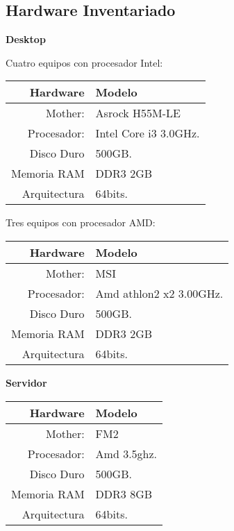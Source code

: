 		
		\subsection{Hardware Inventariado}
		
			\textbf{Desktop}
							
			Cuatro equipos  con procesador Intel:\par\vspace{0.2cm}
				
			\begin{center}
				\begin{tabular}{| r | l |}
					\hline
					Hardware & Modelo \\ \hline
					Mother: & Asrock H55M-LE \\ 
					Procesador: & Intel Core i3 3.0GHz. \\
					Disco Duro & 500GB. \\
					Memoria RAM & DDR3 2GB \\
					Arquitectura & 64bits.\\ \hline
				\end{tabular}
			\end{center}
		
			\vspace{0.3cm}
		
			Tres equipos con procesador AMD:\par\vspace{0.2cm}
					
			\begin{center}			
				\begin{tabular}{| r | l |}
					\hline
					Hardware & Modelo \\ \hline
					Mother: & MSI \\ 
					Procesador: & Amd athlon2 x2 3.00GHz. \\
					Disco Duro & 500GB. \\
					Memoria RAM & DDR3 2GB \\
					Arquitectura & 64bits.\\ \hline
				\end{tabular}
			\end{center}
			
			\vspace{0.3cm}
		
			\textbf{Servidor}	

		
			\begin{center}			
				\begin{tabular}{| r | l |}
					\hline
					Hardware & Modelo \\ \hline
					Mother: & FM2 \\ 
					Procesador: & Amd 3.5ghz. \\
					Disco Duro & 500GB. \\
					Memoria RAM & DDR3 8GB \\
					Arquitectura & 64bits.\\ \hline
				\end{tabular}
			\end{center} 
					
